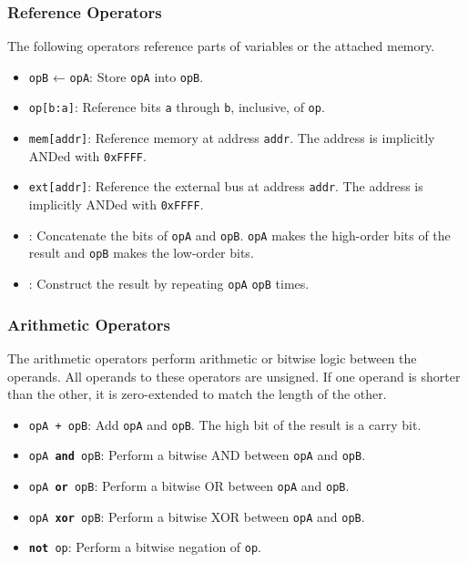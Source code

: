 \documentclass[12pt,a4paper]{article}
\begin{document}
\subsubsection{Reference Operators}
The following operators reference parts of variables or the attached memory.

\begin{itemize}
  \item \texttt{opB} ← \texttt{opA}: Store \texttt{opA} into \texttt{opB}.
  \item \texttt{op[b:a]}: Reference bits \texttt{a} through \texttt{b}, inclusive, of \texttt{op}.
  \item \texttt{mem[addr]}: Reference memory at address \texttt{addr}. The address is implicitly ANDed with \texttt{0xFFFF}.
  \item \texttt{ext[addr]}: Reference the external bus at address \texttt{addr}. The address is implicitly ANDed with \texttt{0xFFFF}.
  \item \texttt{}: Concatenate the bits of \texttt{opA} and \texttt{opB}. \texttt{opA} makes the high-order bits of the result and \texttt{opB} makes the low-order bits.
  \item \texttt{}: Construct the result by repeating \texttt{opA} \texttt{opB} times.
\end{itemize}

\subsubsection{Arithmetic Operators}
The arithmetic operators perform arithmetic or bitwise logic between the operands. All operands to these operators are unsigned. If one operand is shorter than the other, it is zero-extended to match the length of the other.

\begin{itemize}
  \item \texttt{opA + opB}: Add \texttt{opA} and \texttt{opB}. The high bit of the result is a carry bit.
  \item \texttt{opA \textbf{and} opB}: Perform a bitwise AND between \texttt{opA} and \texttt{opB}.
  \item \texttt{opA \textbf{or} opB}: Perform a bitwise OR between \texttt{opA} and \texttt{opB}.
  \item \texttt{opA \textbf{xor} opB}: Perform a bitwise XOR between \texttt{opA} and \texttt{opB}.
  \item \texttt{\textbf{not} op}: Perform a bitwise negation of \texttt{op}.
\end{itemize}
\end{document}
